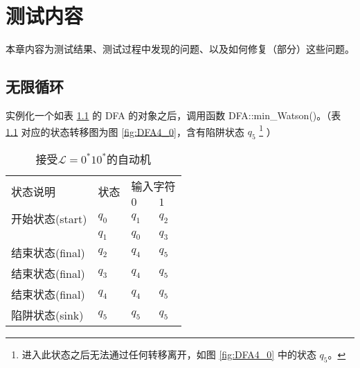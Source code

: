 \chapter{测试内容}\label{cha:realwork}

本章内容为测试结果、测试过程中发现的问题、以及如何修复（部分）这些问题。




\section{无限循环}\label{sec:ohloop}

实例化一个如表 \ref{tab:DFA4} 的 DFA 的对象之后，调用函数 DFA::min\_Watson()。（表 \ref{tab:DFA4} 对应的状态转移图为图 \ref{fig:DFA4_0}，含有陷阱状态 $q_5$ \footnote{进入此状态之后无法通过任何转移离开，如图 \ref{fig:DFA4_0} 中的状态 {$q_5$}。} ）

\begin{table}[!htbp]
    \caption{接受{$\mathcal{L}=0^*10^*$}的自动机{\cite{book1}}}
    \label{tab:DFA4}
    \centering
    \small%
    \setlength{\tabcolsep}{4pt}%
    \renewcommand{\arraystretch}{1.2}%
        \begin{tabular}{l p{3em}<{\centering} p{3em}<{\centering} p{3em}<{\centering}}
        \toprule %
        \multirow{2}{*}{状态说明} & \multirow{2}{*}{状态} & \multicolumn{2}{c}{输入字符} \\
		\cline{3-4}      &    &$0$ & $1$  \\
        \midrule%
        开始状态(start)  & $q_0$ & $q_1$   & $q_2$   \\
                        & $q_1$ & $q_0$   & $q_3$   \\
        结束状态(final) & $q_2$ & $q_4$   & $q_5$   \\
        结束状态(final) & $q_3$ & $q_4$   & $q_5$   \\
        结束状态(final) & $q_4$ & $q_4$   & $q_5$   \\
        陷阱状态(sink) & $q_5$ & $q_5$   & $q_5$   \\
        \bottomrule%
    \end{tabular}
\end{table}

